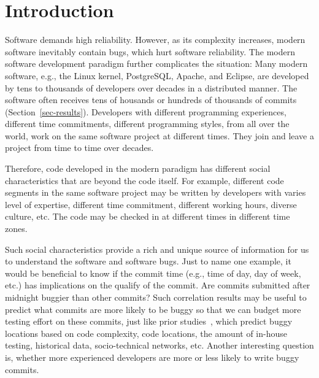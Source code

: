 \section{Introduction}

Software demands high reliability. However, as its complexity increases, 
modern software inevitably contain bugs, which hurt software reliability.
The modern software development paradigm further complicates the situation: 
Many modern software, e.g., the Linux kernel, PostgreSQL, Apache, and Eclipse, 
are developed by tens to thousands of developers over decades %
in a distributed manner. The software often receives tens of housands or hundreds of thousands 
of commits (Section~\ref{sec-results}). 
Developers with different programming experiences, 
different time commitments, different programming styles, from all over the world,
work on the same software project at different times. They join and leave a project 
from time to time over decades.

Therefore, code developed in the modern paradigm has different social characteristics 
that are beyond the code itself. For example, different code segments in the same
software project may be written by developers with  
varies level of expertise, different time 
commitment, different working hours, diverse culture, etc.
The code may be checked in at different times in different time zones. 

Such social characteristics provide a rich and unique source of information for us to 
understand the software and software bugs. Just to name one example, it would be beneficial to know if  
the commit time (e.g., time of day, day of week, etc.) has implications on the qualify of the commit. 
Are commits submitted after midnight buggier than other commits? 
Such correlation results may be useful to predict what commits are more likely
to be buggy so that we can budget more testing effort on these commits, just like prior 
studies~\cite{graves00predicting, guo04robust, Hassan09, libre07, devNetwork08, predictionMenzies10, effort03, ostrand05predicting, 
depGraph08, zimmermann-promise-2007},
which predict buggy locations based on code complexity, 
code locations, the amount of in-house testing, historical data, socio-technical networks, etc. 
Another interesting question is, whether more experienced developers are more or less
likely to write buggy commits. 


